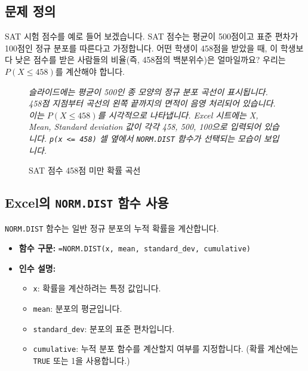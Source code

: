 \documentclass[11pt,a4paper]{article}
\theoremstyle{definition}
\begin{document}
\subsection{문제 정의}
SAT 시험 점수를 예로 들어 보겠습니다. SAT 점수는 평균이 500점이고 표준 편차가 100점인 정규 분포를 따른다고 가정합니다.
어떤 학생이 458점을 받았을 때, 이 학생보다 낮은 점수를 받은 사람들의 비율(즉, 458점의 백분위수)은 얼마일까요?
우리는 $P(X \le 458)$를 계산해야 합니다.

\begin{figure}[h!]
    \centering
    \caption{SAT 점수 458점 미만 확률 곡선}
    \label{fig:sat_less_than}
    \vspace{0.5em}
    \textit{슬라이드에는 평균이 500인 종 모양의 정규 분포 곡선이 표시됩니다. 458점 지점부터 곡선의 왼쪽 끝까지의 면적이 음영 처리되어 있습니다. 이는 $P(X \le 458)$를 시각적으로 나타냅니다. Excel 시트에는 X, Mean, Standard deviation 값이 각각 458, 500, 100으로 입력되어 있습니다. \texttt{p(x <= 458)} 셀 옆에서 \texttt{NORM.DIST} 함수가 선택되는 모습이 보입니다.}
\end{figure}

\subsection{Excel의 \texttt{NORM.DIST} 함수 사용}
\texttt{NORM.DIST} 함수는 일반 정규 분포의 누적 확률을 계산합니다.

\begin{itemize}
    \item \textbf{함수 구문:} \texttt{=NORM.DIST(x, mean, standard\_dev, cumulative)}
    \item \textbf{인수 설명:}
    \begin{itemize}
        \item \texttt{x}: 확률을 계산하려는 특정 값입니다.
        \item \texttt{mean}: 분포의 평균입니다.
        \item \texttt{standard\_dev}: 분포의 표준 편차입니다.
        \item \texttt{cumulative}: 누적 분포 함수를 계산할지 여부를 지정합니다. (확률 계산에는 \texttt{TRUE} 또는 1을 사용합니다.)
    \end{itemize}
\end{itemize}
\end{document}
